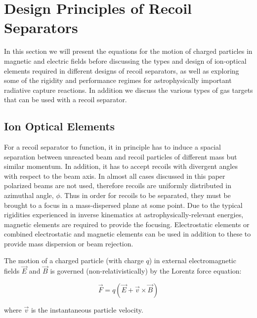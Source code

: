 \section{Design Principles of Recoil Separators}
\label{design}

In this section we will present the equations for the motion of charged particles in magnetic and electric fields before discussing the types and design of ion-optical elements required in different designs of recoil separators, as well as exploring some of the rigidity and performance regimes for astrophysically important radiative capture reactions. In addition we discuss the various types of gas targets that can be used with a recoil separator.

\subsection{Ion Optical Elements}
\label{ion}

For a recoil separator to function, it in principle has to induce a spacial separation between unreacted beam and recoil particles of different mass but similar momentum. In addition, it has to accept recoils with divergent angles with respect to the beam axis. In almost all cases discussed in this paper polarized beams are not used, therefore recoils are uniformly distributed in azimuthal angle, $\phi$. 
Thus in order for recoils to be separated, they must be brought to a focus in a mass-dispersed plane at some point. Due to the typical rigidities experienced in inverse kinematics at astrophysically-relevant energies, magnetic elements are required to provide the focusing. Electrostatic elements or combined electrostatic and magnetic elements can be used in addition to these to provide mass dispersion or beam rejection.  

The motion of a charged particle (with charge $q$) in external electromagnetic fields $\vec{E}$ and $\vec{B}$  is governed (non-relativistically) by the Lorentz force equation:

\begin{equation}
\vec{F}=q(\vec{E}+\vec{v}\times\vec{B})
\end{equation}   

where $\vec{v}$ is the instantaneous particle velocity. 



